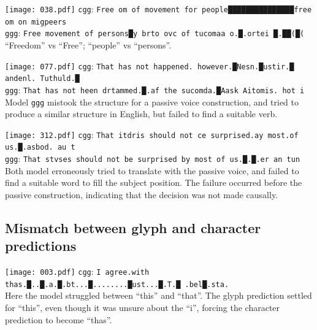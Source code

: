 \documentclass[11pt,twocolumn]{article}
\begin{document}
\vspace{1.2em}\noindent\texttt{[image: 038.pdf]}
\texttt{cgg}: \texttt{Free om of movement for people███████████████free om on migpeers}\\
\texttt{ggg}: \texttt{Free movement of persons█y brto ovc of tucomaa o.█.ortei █.██(█(}\\

\vspace{-0.8em}
``Freedom'' vs ``Free''; ``people'' vs ``persons''.

\vspace{1.2em}\noindent\texttt{[image: 077.pdf]}
\texttt{cgg}: \texttt{That has not happened. however.█Nesn.█ustir.█  andenl. Tuthuld.█}\\
\texttt{ggg}: \texttt{That has not heen drtammed.█.af the sucomda.█Aask Aitomis. hot i}\\

\vspace{-0.8em}
Model \texttt{ggg} mistook the structure for a passive voice construction,
and tried to produce a similar structure in English,
but failed to find a suitable verb.

\vspace{1.2em}\noindent\texttt{[image: 312.pdf]}
\texttt{cgg}: \texttt{That itdris should not ce surprised.ay most.of us.█.asbod.  au t}\\
\texttt{ggg}: \texttt{That stvses should not be surprised by most of us.█.█.er  an tun}\\

\vspace{-0.8em}
Both model erroneously tried to translate with the passive voice,
and failed to find a suitable word to fill the subject position.
The failure occurred before the passive construction,
indicating that the decision was not made causally.

\subsection{Mismatch between glyph and character predictions}\label{sec:mism-betw-glyph}

\vspace{1.2em}\noindent\texttt{[image: 003.pdf]}
\texttt{cgg}: \texttt{I agree.with thas.█..█.a.█.bt...█........█ust...█.T.█ .bel█.sta.}\\

\vspace{-0.8em}
Here the model struggled between ``this'' and ``that''.
The glyph prediction settled for ``this'',
even though it was unsure about the ``i'',
forcing the character prediction to become ``thas''.
\end{document}
